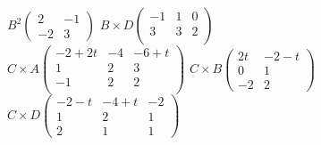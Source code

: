 \documentclass{HM}
\begin{document}
\begin{enumerate}
$B^2\begin{pmatrix}
	2 & -1 \\
	-2 & 3
\end{pmatrix}$
$B\times D\begin{pmatrix}
	-1 & 1 & 0\\
	3 & 3 & 2\\
\end{pmatrix}$\\

$C\times A\begin{pmatrix}
	-2+2t & -4 & -6+t\\
	1 & 2 & 3\\
	-1 & 2 & 2\\
\end{pmatrix}$
$C\times B\begin{pmatrix}
	2t & -2-t\\
	0 & 1\\
	-2 & 2
\end{pmatrix}$
$C\times D\begin{pmatrix}
	-2-t & -4+t &-2\\
	1 & 2 & 1\\
	2 & 1 & 1
\end{pmatrix}$\\


\end{enumerate}
\end{document}

